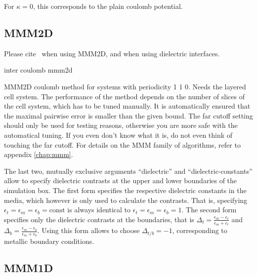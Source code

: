 For $\kappa = 0$, this corresponds to the plain coulomb potential.


\subsection{MMM2D}

\begin{citebox}
  Please cite~ when using MMM2D, and
   when using dielectric interfaces.
\end{citebox}


\begin{essyntax}
 inter coulomb  mmm2d 
  \begin{features}
  \end{features}
\end{essyntax}
MMM2D coulomb method for systems with periodicity 1 1 0. Needs the
layered cell system. The performance of the method depends on the
number of slices of the cell system, which has to be tuned manually.
It is automatically ensured that the maximal pairwise error is smaller
than the given bound. The far cutoff setting should only be used for
testing reasons, otherwise you are more safe with the automatical
tuning. If you even don't know what it is, do not even think of
touching the far cutoff. For details on the MMM family of algorithms,
refer to appendix \vref{chap:mmm}.

The last two, mutually exclusive arguments ``dielectric'' and
``dielectric-constants'' allow to specify dielectric contrasts at the
upper and lower boundaries of the simulation box. The first form
specifies the respective dielectric constants in the media, which
however is only used to calculate the contrasts. That is, specifying 
$\epsilon_t=\epsilon_m=\epsilon_b=\text{const}$ is always identical to
$\epsilon_t=\epsilon_m=\epsilon_b=1$. The second form specifies only
the dielectric contrasts at the boundaries, that is
$\Delta_t=\frac{\epsilon_m-\epsilon_t}{\epsilon_m+\epsilon_t}$ and
$\Delta_b=\frac{\epsilon_m-\epsilon_b}{\epsilon_m+\epsilon_b}$. Using
this form allows to choose $\Delta_{t/b}=-1$, corresponding to
metallic boundary conditions.

\subsection{MMM1D}


